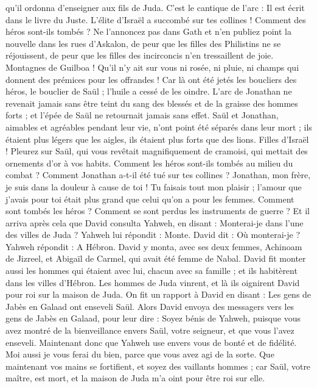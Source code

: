 \begin{multicols}{2}
qu'il ordonna d'enseigner aux fils de Juda. C'est le cantique de l'arc : Il est écrit dans le livre du Juste.
L'élite d'Israël a succombé sur tes collines ! Comment des héros sont-ils tombés ?
Ne l'annoncez pas dans Gath et n'en publiez point la nouvelle dans les rues d'Askalon, de peur que les filles des Philistins ne se réjouissent, de peur que les filles des incirconcis n'en tressaillent de joie.
Montagnes de Guilboa ! Qu'il n'y ait sur vous ni rosée, ni pluie, ni champs qui donnent des prémices pour les offrandes ! Car là ont été jetés les boucliers des héros, le bouclier de Saül ; l'huile a cessé de les oindre.
L'arc de Jonathan ne revenait jamais sans être teint du sang des blessés et de la graisse des hommes forts ; et l'épée de Saül ne retournait jamais sans effet.
Saül et Jonathan, aimables et agréables pendant leur vie, n'ont point été séparés dans leur mort ; ils étaient plus légers que les aigles, ils étaient plus forts que des lions.
Filles d'Israël ! Pleurez sur Saül, qui vous revêtait magnifiquement de cramoisi, qui mettait des ornements d'or à vos habits.
Comment les héros sont-ils tombés au milieu du combat ? Comment Jonathan a-t-il été tué sur tes collines ?
Jonathan, mon frère, je suis dans la douleur à cause de toi ! Tu faisais tout mon plaisir ; l'amour que j'avais pour toi était plus grand que celui qu'on a pour les femmes.
Comment sont tombés les héros ? Comment se sont perdus les instruments de guerre ?
\VerseOne{}Et il arriva après cela que David consulta Yahweh, en disant : Monterai-je dans l'une des villes de Juda ? Yahweh lui répondit : Monte. David dit : Où monterai-je ? Yahweh répondit : A Hébron.
David y monta, avec ses deux femmes, Achinoam de Jizreel, et Abigaïl de Carmel, qui avait été femme de Nabal.
David fit monter aussi les hommes qui étaient avec lui, chacun avec sa famille ; et ils habitèrent dans les villes d'Hébron.
Les hommes de Juda vinrent, et là ils oignirent David pour roi sur la maison de Juda. On fit un rapport à David en disant : Les gens de Jabès en Galaad ont enseveli Saül.
Alors David envoya des messagers vers les gens de Jabès en Galaad, pour leur dire : Soyez bénis de Yahweh, puisque vous avez montré de la bienveillance envers Saül, votre seigneur, et que vous l'avez enseveli.
Maintenant donc que Yahweh use envers vous de bonté et de fidélité. Moi aussi je vous ferai du bien, parce que vous avez agi de la sorte.
Que maintenant vos mains se fortifient, et soyez des vaillants hommes ; car Saül, votre maître, est mort, et la maison de Juda m'a oint pour être roi sur elle.

\end{multicols}
